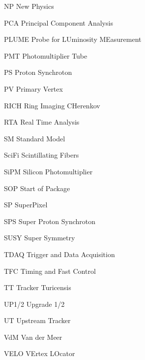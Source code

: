 \begin{abbreviations}
    \item[NP] New Physics
    \item[PCA] Principal Component Analysis
    \item[PLUME] Probe for LUminosity MEasurement
    \item[PMT] Photomultiplier Tube
    \item[PS] Proton Synchroton
    \item[PV] Primary Vertex
    \item[RICH] Ring Imaging CHerenkov
    \item[RTA] Real Time Analysis
    \item[SM] Standard Model
    \item[SciFi] Scintillating Fibers
    \item[SiPM] Silicon Photomultiplier
    \item[SOP] Start of Package
    \item[SP] SuperPixel
    \item[SPS] Super Proton Synchroton
    \item[SUSY] Super Symmetry
    \item[TDAQ] Trigger and Data Acquisition
    \item[TFC] Timing and Fast Control
    \item[TT] Tracker Turicensis
    \item[UP1/2] Upgrade 1/2
    \item[UT] Upstream Tracker
    \item[VdM] Van der Meer
    \item[VELO] VErtex LOcator
\end{abbreviations}

